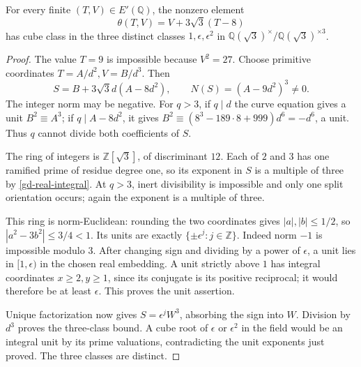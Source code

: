 \begin{lemma}\label{gd-three-classes}
For every finite \((T,V)\in E'(\mathbb Q)\), the nonzero element
\[
 \theta(T,V)=V+3\sqrt3(T-8)
\]
has cube class in the three distinct classes
\(1,\epsilon,\epsilon^2\) in
\(\mathbb Q(\sqrt3)^\times/\mathbb Q(\sqrt3)^{\times3}\).
\end{lemma}
\begin{proof}
The value \(T=9\) is impossible because \(V^2=27\).
Choose primitive coordinates \(T=A/d^2,V=B/d^3\).
Then
\begin{equation}\label{gd-real-integral}
 S=B+3\sqrt3d(A-8d^2),\qquad N(S)=(A-9d^2)^3\ne0.
\end{equation}
The integer norm may be negative. For \(q>3\), if \(q\mid d\)
the curve equation gives a unit \(B^2\equiv A^3\); if
\(q\mid A-8d^2\), it gives
\(B^2\equiv(8^3-189\cdot8+999)d^6=-d^6\), a unit.
Thus \(q\) cannot divide both coefficients of \(S\).

The ring of integers is \(\mathbb Z[\sqrt3]\), of discriminant \(12\).
Each of \(2\) and \(3\) has one ramified prime of residue degree one,
so its exponent in \(S\) is a multiple of three by
\eqref{gd-real-integral}. At \(q>3\), inert divisibility is impossible
and only one split orientation occurs; again the exponent is a
multiple of three.

This ring is norm-Euclidean: rounding the two coordinates gives
\(|a|,|b|\leq1/2\), so \(|a^2-3b^2|\leq3/4<1\).
Its units are exactly \(\{\pm\epsilon^j:j\in\mathbb Z\}\).
Indeed norm \(-1\) is impossible modulo \(3\). After changing sign
and dividing by a power of \(\epsilon\), a unit lies in
\([1,\epsilon)\) in the chosen real embedding. A unit strictly
above \(1\) has integral coordinates \(x\geq2,y\geq1\), since its
conjugate is its positive reciprocal; it would therefore be at least
\(\epsilon\). This proves the unit assertion.

Unique factorization now gives \(S=\epsilon^jW^3\), absorbing the
sign into \(W\). Division by \(d^3\) proves the three-class bound.
A cube root of \(\epsilon\) or \(\epsilon^2\) in the field would be
an integral unit by its prime valuations, contradicting the unit
exponents just proved. The three classes are distinct.
\end{proof}

